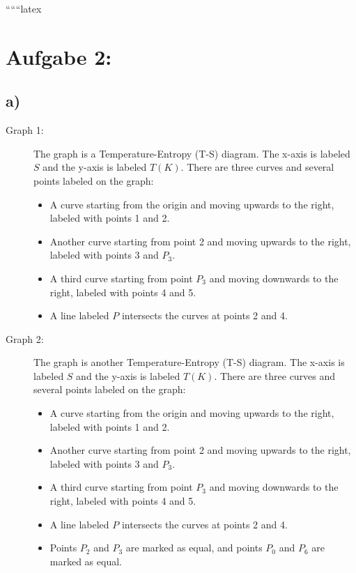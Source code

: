 
``````latex


\section*{Aufgabe 2:}

\subsection*{a)}

\begin{description}
    \item[Graph 1:] The graph is a Temperature-Entropy (T-S) diagram. The x-axis is labeled $S$ and the y-axis is labeled $T(K)$. There are three curves and several points labeled on the graph:
    \begin{itemize}
        \item A curve starting from the origin and moving upwards to the right, labeled with points 1 and 2.
        \item Another curve starting from point 2 and moving upwards to the right, labeled with points 3 and $P_3$.
        \item A third curve starting from point $P_3$ and moving downwards to the right, labeled with points 4 and 5.
        \item A line labeled $P$ intersects the curves at points 2 and 4.
    \end{itemize}
    \item[Graph 2:] The graph is another Temperature-Entropy (T-S) diagram. The x-axis is labeled $S$ and the y-axis is labeled $T(K)$. There are three curves and several points labeled on the graph:
    \begin{itemize}
        \item A curve starting from the origin and moving upwards to the right, labeled with points 1 and 2.
        \item Another curve starting from point 2 and moving upwards to the right, labeled with points 3 and $P_3$.
        \item A third curve starting from point $P_3$ and moving downwards to the right, labeled with points 4 and 5.
        \item A line labeled $P$ intersects the curves at points 2 and 4.
        \item Points $P_2$ and $P_3$ are marked as equal, and points $P_0$ and $P_6$ are marked as equal.
    \end{itemize}
\end{description}

